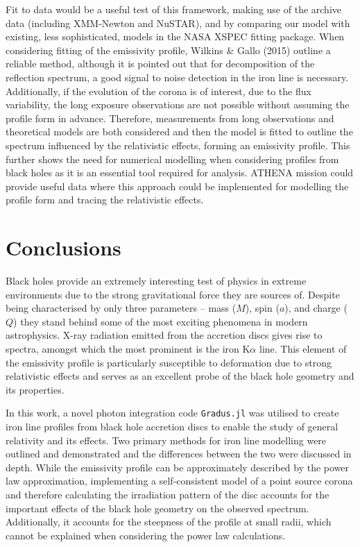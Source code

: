 \documentclass[fleqn,usenatbib,useAMS]{mnras}
\begin{document}
Fit to data would be a useful test of this framework, making use of the archive data (including XMM-Newton and NuSTAR), and by comparing our model with existing, less sophisticated, models in the NASA XSPEC fitting package. 
When considering fitting of the emissivity profile, Wilkins \& Gallo (2015) \cite{wilkins2015driving} outline a reliable method, although it is pointed out that for decomposition of the reflection spectrum, a good signal to noise detection in the iron line is necessary. Additionally, if the evolution of the corona is of interest, due to the flux variability, the long exposure observations are not possible without assuming the profile form in advance. Therefore, measurements from long observations and theoretical models are both considered and then the model is fitted to outline the spectrum influenced by the relativistic effects, forming an emissivity profile. This further shows the need for numerical modelling when considering profiles from black holes as it is an essential tool required for analysis. 
ATHENA mission could provide useful data where this approach could be implemented for modelling the profile form and tracing the relativistic effects.


\section{Conclusions} %
Black holes provide an extremely interesting test of physics in extreme environments due to the strong gravitational force they are sources of. Despite being characterised by only three parameters -- mass ($M$), spin ($a$), and charge ($Q$) they stand behind some of the most exciting phenomena in modern astrophysics. X-ray radiation emitted from the accretion discs gives rise to spectra, amongst which the most prominent is the iron K$\alpha$ line. This element of the emissivity profile is particularly susceptible to deformation due to strong relativistic effects and serves as an excellent probe of the black hole geometry and its properties.

In this work, a novel photon integration code {\tt Gradus.jl} was utilised to create iron line profiles from black hole accretion discs to enable the study of general relativity and its effects. Two primary methods for iron line modelling were outlined and demonstrated and the differences between the two were discussed in depth. While the emissivity profile can be approximately described by the power law approximation, implementing a self-consistent model of a point source corona and therefore calculating the irradiation pattern of the disc accounts for the important effects of the black hole geometry on the observed spectrum. Additionally, it accounts for the steepness of the profile at small radii, which cannot be explained when considering the power law calculations. 
\end{document}
